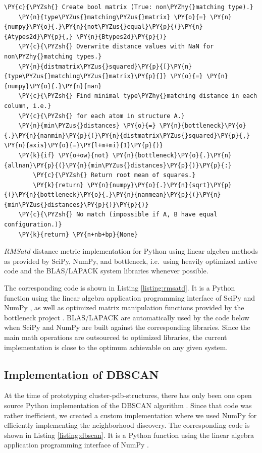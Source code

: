 \begin{listing}
\begin{Verbatim}[fontsize=\tiny,commandchars=\\\{\}]
    \PY{c}{\PYZsh{} Create bool matrix (True: non\PYZhy{}matching type).}
    \PY{n}{type\PYZus{}matching\PYZus{}matrix} \PY{o}{=} \PY{n}{numpy}\PY{o}{.}\PY{n}{not\PYZus{}equal}\PY{p}{(}\PY{n}{Atypes2d}\PY{p}{,} \PY{n}{Btypes2d}\PY{p}{)}
    \PY{c}{\PYZsh{} Overwrite distance values with NaN for non\PYZhy{}matching types.}
    \PY{n}{distmatrix\PYZus{}squared}\PY{p}{[}\PY{n}{type\PYZus{}matching\PYZus{}matrix}\PY{p}{]} \PY{o}{=} \PY{n}{numpy}\PY{o}{.}\PY{n}{nan}
    \PY{c}{\PYZsh{} Find minimal type\PYZhy{}matching distance in each column, i.e.}
    \PY{c}{\PYZsh{} for each atom in structure A.}
    \PY{n}{min\PYZus{}distances} \PY{o}{=} \PY{n}{bottleneck}\PY{o}{.}\PY{n}{nanmin}\PY{p}{(}\PY{n}{distmatrix\PYZus{}squared}\PY{p}{,} \PY{n}{axis}\PY{o}{=}\PY{l+m+mi}{1}\PY{p}{)}
    \PY{k}{if} \PY{o+ow}{not} \PY{n}{bottleneck}\PY{o}{.}\PY{n}{allnan}\PY{p}{(}\PY{n}{min\PYZus{}distances}\PY{p}{)}\PY{p}{:}
        \PY{c}{\PYZsh{} Return root mean of squares.}
        \PY{k}{return} \PY{n}{numpy}\PY{o}{.}\PY{n}{sqrt}\PY{p}{(}\PY{n}{bottleneck}\PY{o}{.}\PY{n}{nanmean}\PY{p}{(}\PY{n}{min\PYZus{}distances}\PY{p}{)}\PY{p}{)}
    \PY{c}{\PYZsh{} No match (impossible if A, B have equal configuration.)}
    \PY{k}{return} \PY{n+nb+bp}{None}
\end{Verbatim}
\caption{$RMSatd$ distance metric implementation for Python using linear algebra
methods as provided by SciPy, NumPy, and bottleneck, i.e.\ using heavily
optimized native code and the BLAS/LAPACK system libraries whenever possible.}
\label{listing:rmsatd}
\end{listing}

The corresponding code is shown in Listing \ref{listing:rmsatd}. It is a Python
function using the linear algebra application programming interface of SciPy and
NumPy \cite{scipy_numpy}, as well as optimized matrix manipulation functions
provided by the bottleneck project \cite{py_bottleneck}. BLAS/LAPACK are
automatically used by the code below when SciPy and NumPy are built against the
corresponding libraries. Since the main math operations are outsourced to
optimized libraries, the current implementation is close to the optimum
achievable on any given system.


\subsection{Implementation of DBSCAN}
\label{impl_dbscan}

At the time of prototyping cluster-pdb-structures, there has only been one open
source Python implementation of the DBSCAN algorithm \cite{scikit_learn}. Since
that code was rather inefficient, we created a custom implementation where we
used NumPy for efficiently implementing the neighborhood discovery. The
corresponding code is shown in Listing \ref{listing:dbscan}. It is a Python
function using the linear algebra application programming interface of NumPy
\cite{scipy_numpy}.

